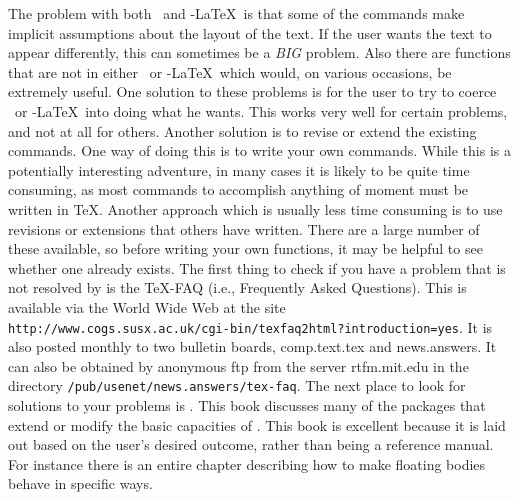 \documentclass[11pt,titlepage]{article}
\def\AmS{{$\mathcal{A}$\kern-.14em\lower.5ex\hbox{$\mathcal{M}$}%
\kern-.05em$\mathcal{S}$}}
\def\AmSLaTeX{\protect\AmS-\protect\LaTeX}
\begin{document}
The problem with both \LaTeXe\ and \AmSLaTeX\ is that some of the commands
make implicit assumptions about the layout of the text.  If the user wants the
text to appear differently, this can sometimes be a {\Large\emph{BIG}}
problem.  Also there are functions that are not in either \LaTeXe\ or
\AmSLaTeX\ which would, on various occasions, be extremely useful.  One
solution to these problems is for the user to try to coerce \LaTeXe\ or
\AmSLaTeX\ into doing what he wants.  This works very well for certain
problems, and not at all for others.  Another solution is to revise or extend
the existing commands.  One way of doing this is to write your own commands.
While this is a potentially interesting adventure, in many cases it is likely
to be quite time consuming, as most commands to accomplish anything of moment
must be written in \TeX.  Another approach which is usually less time
consuming is to use revisions or extensions that others have written.  There
are a large number of these available, so before writing your own functions,
it may be helpful to see whether one already exists.  The first thing to check
if you have a problem that is not resolved by \cite{Lam94a} is the \TeX -FAQ
(i.e., Frequently Asked Questions).  This is available via the World Wide Web
at the site
\verb+http://www.cogs.susx.ac.uk/cgi-bin/texfaq2html?introduction=yes+.  It is
also posted monthly to two bulletin boards, \textsf{comp.text.tex} and
\textsf{news.answers}.  It can also be obtained by anonymous ftp from the
server \textsf{rtfm.mit.edu} in the directory
\texttt{/pub/usenet/news.answers/tex-faq}.  The next place to look for
solutions to your problems is \cite{Goo94a}.  This book discusses many of the
packages that extend or modify the basic capacities of \LaTeXe.  This book is
excellent because it is laid out based on the user's desired outcome, rather
than being a reference manual.  For instance there is an entire chapter
describing how to make floating bodies behave in specific ways.
\end{document}
